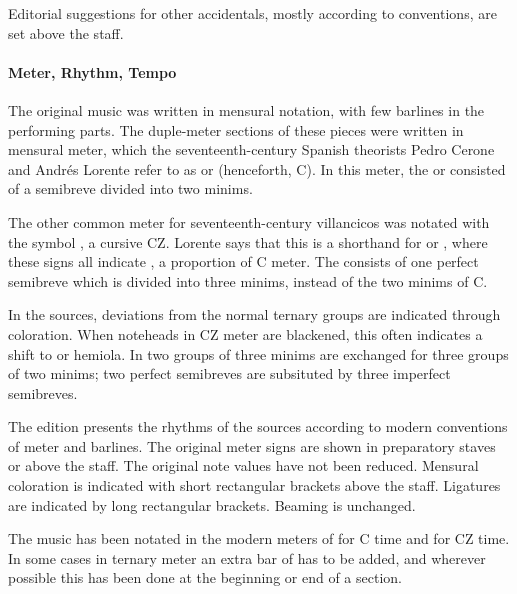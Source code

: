 Editorial suggestions for other accidentals, mostly according to  conventions, are set above the staff.

\paragraph{Meter, Rhythm, Tempo}
The original music was written in mensural notation, with few barlines in the 
performing parts. 
The duple-meter sections of these pieces were written in mensural \meterC{} 
meter, which the seventeenth-century Spanish theorists Pedro Cerone and Andrés 
Lorente refer to as  or  
(henceforth, C).%
  \autocites[537]{Cerone:Melopeo}[156, 210]{Lorente:Porque}
In this meter, the  or  consisted of a semibreve 
divided into two minims.%
  \autocites{GonzalezValle:MusicaTexto}{GonzalezValle:CompasCabezon}

The other common meter for seventeenth-century villancicos was notated with the 
symbol \meterCZ{}, a cursive CZ.
Lorente says that this is a shorthand for \meterCThree{} or \meterCThreeTwo{}, 
where these signs all indicate , a 
proportion of C meter.%
  \autocite[165]{Lorente:Porque}
The  consists of one perfect semibreve which is divided into three 
minims, instead of the two minims of C.

In the sources, deviations from the normal ternary groups are indicated through 
coloration. 
When noteheads in CZ meter are blackened, this often indicates a shift to 
 or hemiola.
In  two groups of three minims are exchanged for three 
groups of two minims; two perfect semibreves are subsituted by three imperfect 
semibreves.

The edition presents the rhythms of the sources according to modern conventions 
of meter and barlines.
The original meter signs are shown in preparatory staves or above the staff.
The original note values have not been reduced.
Mensural coloration is indicated with short rectangular brackets above the 
staff.
Ligatures are indicated by long rectangular brackets.
Beaming is unchanged.

The music has been notated in the modern meters of  for C time and 
 for CZ time.
In some cases in ternary meter an extra bar of  has to be added, 
and wherever possible this has been done at the beginning or end of a section.

